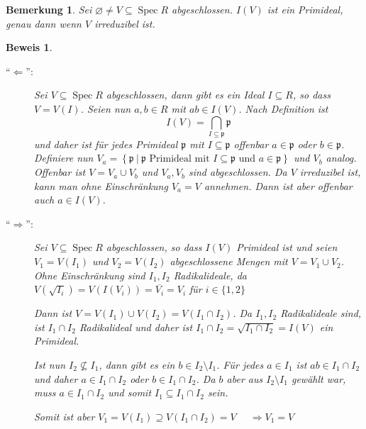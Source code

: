 \documentclass[a4paper,oneside]{scrbook}
\theoremstyle{break}
\newtheorem{Bem}[Def]{Bemerkung}
\theoremstyle{nonumberbreak}
\theoremstyle{nonumberplain}
\newtheorem{Bew}{Beweis}
\theoremstyle{break}
\renewcommand{\emptyset}{%
	\ensuremath{\varnothing}%
}
\newcommand{\Spec}{%
	\ensuremath{\operatorname{Spec}}%
}
\newcommand{\closure}[1]{%
	\ensuremath{\overline{#1}}%
}
\newcommand{\rad}[1]{%
	\ensuremath{\sqrt{#1}}%
}
\begin{document}
\begin{Bem}\label{bem:irreducible-prime_ideal}
	Sei $\emptyset \neq V \subseteq \Spec R$ abgeschlossen. $I\left(V\right)$ ist ein Primideal, genau dann wenn $V$ irreduzibel ist.
\end{Bem}
\begin{Bew}
	\begin{description}
		\item["`$\Leftarrow$"':]
			Sei $V \subseteq \Spec R$ abgeschlossen, dann gibt es ein Ideal $I \subseteq R$, so dass $V = V\left(I\right)$.
			Seien nun $a,b \in R$ mit $ab \in I\left(V\right)$.
			Nach Definition ist
			\[ I\left(V\right) = \bigcap_{I \subseteq \mathfrak{p} } \mathfrak{p} \]
			und daher ist für jedes Primideal $\mathfrak{p}$ mit $I \subseteq \mathfrak{p}$ offenbar $a \in \mathfrak{p}$ oder $b\in \mathfrak{p}$.
			Definiere nun $V_a = \left\{ \mathfrak{p}\ |\ \mathfrak{p} \text{ Primideal mit } I \subseteq \mathfrak{p} \text{ und } a \in \mathfrak{p} \right\}$ und $V_b$ analog.
			Offenbar ist $V = V_a \cup V_b$ und $V_a, V_b$ sind abgeschlossen.
			Da $V$ irreduzibel ist, kann man ohne Einschränkung $V_a = V$ annehmen. Dann ist aber offenbar auch $a \in I\left(V\right)$.
		\item["`$\Rightarrow$"':]
			Sei $V \subseteq \Spec R$ abgeschlossen, so dass $I(V)$ Primideal ist und 
			seien $V_1 = V\left(I_1\right)$ und $V_2 = V\left(I_2\right)$ abgeschlossene Mengen mit $V = V_1 \cup V_2$.
			Ohne Einschränkung sind $I_1,I_2$ Radikalideale, da 
			$V( \rad{I_i} ) = V( I( V_i ) ) = \closure{V_i} = V_i$ für $i \in \{1,2\}$

			Dann ist 
			$ V = V(I_1) \cup V(I_2) = V( I_1 \cap I_2 ) $.
			Da $I_1, I_2$ Radikalideale sind, ist $I_1 \cap I_2$ Radikalideal und daher ist 
			$I_1 \cap I_2 =\rad{I_1 \cap I_2} = I(V)$ ein Primideal.

			Ist nun $I_2 \nsubseteq I_1$, dann gibt es ein $b \in I_2 \setminus I_1$.
			Für jedes $a \in I_1$ ist $ab \in I_1 \cap I_2$ und daher $a \in I_1 \cap I_2$ oder $b \in I_1 \cap I_2$.
			Da $b$ aber aus $I_2 \setminus I_1$ gewählt war, muss $a \in I_1 \cap I_2$ und somit 
			$I_1 \subseteq I_1 \cap I_2$ sein.

			Somit ist aber $V_1 = V(I_1) \supseteq V(I_1 \cap I_2) = V$ 
			$\quad\Rightarrow V_1 = V$
	\end{description}
\end{Bew}
\end{document}
